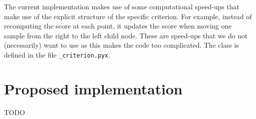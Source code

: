 \documentclass[11pt, a4paper]{article}
\begin{document}
The current implementation makes use of some computational speed-ups
that make use of the explicit structure of the specific criterion. For
example, instead of recomputing the score at each point, it updates
the score when moving one sample from the right to the left child
node. These are speed-ups that we do not (necessarily) want to use as
this makes the code too complicated. The class is defined in the file
\texttt{\_criterion.pyx}.


\section{Proposed implementation}\label{sec:implementation}

TODO
\end{document}
